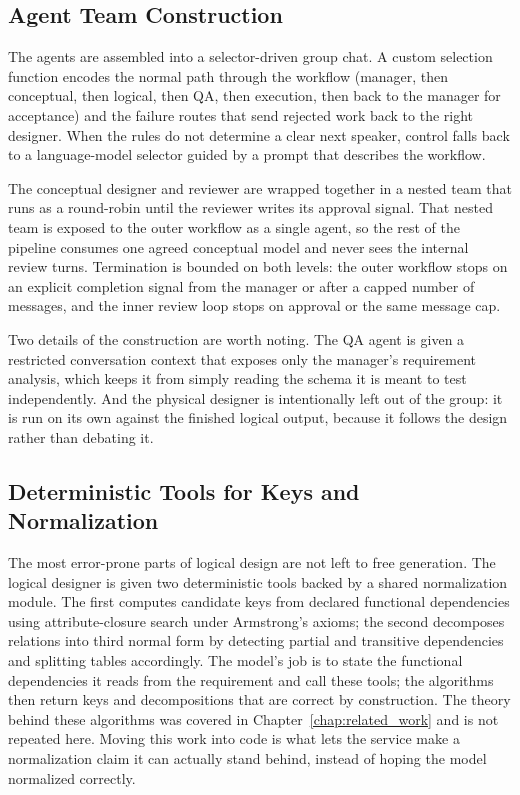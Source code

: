 \subsection{Agent Team Construction}

The agents are assembled into a selector-driven group chat. A custom selection function encodes the normal path through the workflow (manager, then conceptual, then logical, then QA, then execution, then back to the manager for acceptance) and the failure routes that send rejected work back to the right designer. When the rules do not determine a clear next speaker, control falls back to a language-model selector guided by a prompt that describes the workflow.

The conceptual designer and reviewer are wrapped together in a nested team that runs as a round-robin until the reviewer writes its approval signal. That nested team is exposed to the outer workflow as a single agent, so the rest of the pipeline consumes one agreed conceptual model and never sees the internal review turns. Termination is bounded on both levels: the outer workflow stops on an explicit completion signal from the manager or after a capped number of messages, and the inner review loop stops on approval or the same message cap.

Two details of the construction are worth noting. The QA agent is given a restricted conversation context that exposes only the manager's requirement analysis, which keeps it from simply reading the schema it is meant to test independently. And the physical designer is intentionally left out of the group: it is run on its own against the finished logical output, because it follows the design rather than debating it.

\subsection{Deterministic Tools for Keys and Normalization}

The most error-prone parts of logical design are not left to free generation. The logical designer is given two deterministic tools backed by a shared normalization module. The first computes candidate keys from declared functional dependencies using attribute-closure search under Armstrong's axioms; the second decomposes relations into third normal form by detecting partial and transitive dependencies and splitting tables accordingly. The model's job is to state the functional dependencies it reads from the requirement and call these tools; the algorithms then return keys and decompositions that are correct by construction. The theory behind these algorithms was covered in Chapter~\ref{chap:related_work} and is not repeated here. Moving this work into code is what lets the service make a normalization claim it can actually stand behind, instead of hoping the model normalized correctly.


